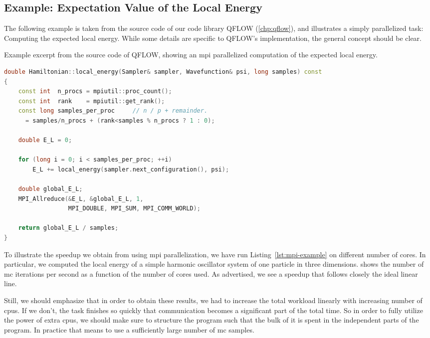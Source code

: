 \documentclass[Thesis.tex]{subfiles}
\begin{document}
\subsection{Example: Expectation Value of the Local Energy}

The following example is taken from the source code of our code library QFLOW
(\cref{chp:qflow}), and illustrates a simply parallelized task: Computing the
expected local energy. While some details are specific to QFLOW's
implementation, the general concept should be clear.

\begin{lstfloat}
  \centering
\caption{Example excerpt from the source code of QFLOW, showing an \gls{mpi} parallelized computation of the expected local energy.}
\begin{lstlisting}[language=C++, label={lst:mpi-example}]
double Hamiltonian::local_energy(Sampler& sampler, Wavefunction& psi, long samples) const
{
    const int  n_procs = mpiutil::proc_count();
    const int  rank    = mpiutil::get_rank();
    const long samples_per_proc     // n / p + remainder.
      = samples/n_procs + (rank<samples % n_procs ? 1 : 0);

    double E_L = 0;

    for (long i = 0; i < samples_per_proc; ++i)
        E_L += local_energy(sampler.next_configuration(), psi);

    double global_E_L;
    MPI_Allreduce(&E_L, &global_E_L, 1,
                  MPI_DOUBLE, MPI_SUM, MPI_COMM_WORLD);

    return global_E_L / samples;
}
\end{lstlisting}
\end{lstfloat}

To illustrate the speedup we obtain from using \gls{mpi} parallelization, we have run
Listing~\ref{lst:mpi-example} on different number of cores. In particular, we computed
the local energy of a simple harmonic oscillator system of one particle in three
dimensions.  shows the number of \gls{mc} iterations per second
as a function of the number of cores used. As advertised, we see a speedup that
follows closely the ideal linear line.

Still, we should emphasize that in order to obtain these results, we had to
increase the total workload linearly with increasing number of \glspl{cpu}. If we
don't, the task finishes so quickly that communication becomes a significant
part of the total time. So in order to fully utilize the power
of extra \glspl{cpu}, we should make sure to structure the program such that the bulk of
it is spent in the independent parts of the program. In practice that means to
use a sufficiently large number of \gls{mc} samples.
\end{document}
